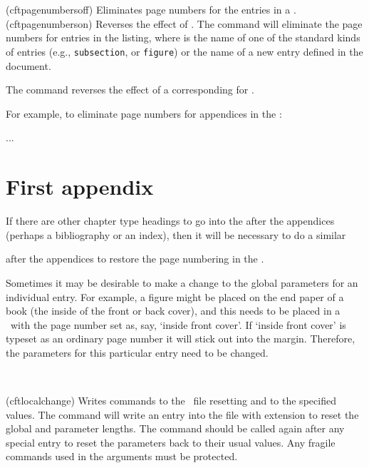 \begin{syntax}
\cmd{\cftpagenumbersoff} \\
\cmd{\cftpagenumberson} \\
\end{syntax}
\glossary(cftpagenumbersoff)%
  {}%
  {Eliminates page numbers for the  entries in a \listofx.}
\glossary(cftpagenumberson)%
  {}%
  {Reverses the effect of .}
 The command \cmd{\cftpagenumbersoff} will
 eliminate the page numbers for  entries in the listing, where
  is the name of one of the standard
 kinds of entries (e.g., \texttt{subsection}, or \texttt{figure}) or the 
 name of a new entry defined in the document.

    The command \cmd{\cftpagenumberson} reverses
 the effect of a corresponding \cmd{\cftpagenumbersoff} for .
 
    For example, to eliminate page numbers for appendices 
in the \toc:
 \begin{lcode}
 ...
 \appendix
 \chapter{First appendix}
 \end{lcode}
 If there are other chapter type headings to go 
into the \toc{} after the  appendices (perhaps a 
bibliography or an index), 
 then it will be necessary to do a similar 
 \begin{lcode}
 \end{lcode}
 after the appendices to restore the page numbering in 
the \toc.

 Sometimes it may be desirable to make a change to the global parameters
 for an individual entry. For example, a figure might be 
placed on the end paper of a book (the inside of the front 
or back cover), and this needs to be placed in a \lof\ with the page number 
set as, say,  `inside front cover'. If `inside front cover' is typeset as 
an ordinary page number it will stick out into the margin. 
Therefore, the parameters for this particular entry need to be changed.

\begin{syntax}
\cmd{\cftlocalchange} \\
\end{syntax}
\glossary(cftlocalchange)%
  {}%
  {Writes commands to the  \listofx\ file resetting
    and  to the specified values.}
 The command \cmd{\cftlocalchange} 
 will write an entry into the file with extension  to reset 
the global \cmd{\@pnumwidth} and \cmd{\@tocrmarg} parameter lengths. 
 The command should be called again after any special entry to reset
 the parameters back to their usual values. Any fragile commands used
 in the arguments must be protected.

